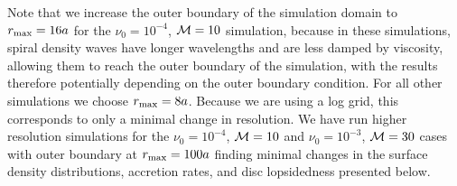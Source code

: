 Note that we increase the outer boundary of the simulation domain to
$r_{\rm max}=16a$ for the $\nu_0 = 10^{-4}$, $\mathcal{M}=10$ simulation,
because in these simulations, spiral density waves have longer
wavelengths and are less damped by viscosity, allowing them to reach
the outer boundary of the simulation, with the results therefore
potentially depending on the outer boundary condition. For all other
simulations we choose $r_{\rm max}=8a$. Because we are using a log
grid, this corresponds to only a minimal change in resolution. We have
run higher resolution simulations for the $\nu_0 = 10^{-4}$,
$\mathcal{M}=10$ and $\nu_0 = 10^{-3}$, $\mathcal{M}=30$ cases with outer boundary
at $r_{\rm max}=100a$ finding minimal changes in the surface density
distributions, accretion rates, and disc lopsidedness presented below.



